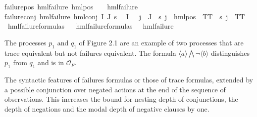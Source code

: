 \begin{isabellebody}
failure{\isacharunderscore}{\kern0pt}pos{\isacharcolon}{\kern0pt}\ {\isachardoublequoteopen}hml{\isacharunderscore}{\kern0pt}failure\ {\isacharparenleft}{\kern0pt}hml{\isacharunderscore}{\kern0pt}pos\ {\isasymalpha}\ {\isasymphi}{\isacharparenright}{\kern0pt}{\isachardoublequoteclose}\ \ {\isachardoublequoteopen}hml{\isacharunderscore}{\kern0pt}failure\ {\isasymphi}{\isachardoublequoteclose}\ {\isacharbar}{\kern0pt}\isanewline
failure{\isacharunderscore}{\kern0pt}conj{\isacharcolon}{\kern0pt}\ {\isachardoublequoteopen}hml{\isacharunderscore}{\kern0pt}failure\ {\isacharparenleft}{\kern0pt}hml{\isacharunderscore}{\kern0pt}conj\ I\ J\ {\isasympsi}s{\isacharparenright}{\kern0pt}{\isachardoublequoteclose}\ \isanewline
{}\ {\isachardoublequoteopen}I\ {\isacharequal}{\kern0pt}\ {\isacharbraceleft}{\kern0pt}{\isacharbraceright}{\kern0pt}{\isachardoublequoteclose}\ {\isachardoublequoteopen}{\isacharparenleft}{\kern0pt}{\isasymforall}j\ {\isasymin}\ J{\isachardot}{\kern0pt}\ {\isacharparenleft}{\kern0pt}{\isasymexists}{\isasymalpha}{\isachardot}{\kern0pt}\ {\isacharparenleft}{\kern0pt}{\isacharparenleft}{\kern0pt}{\isasympsi}s\ j{\isacharparenright}{\kern0pt}\ {\isacharequal}{\kern0pt}\ hml{\isacharunderscore}{\kern0pt}pos\ {\isasymalpha}\ TT{\isacharparenright}{\kern0pt}{\isacharparenright}{\kern0pt}\ {\isasymor}\ {\isasympsi}s\ j\ {\isacharequal}{\kern0pt}\ TT{\isacharparenright}{\kern0pt}{\isachardoublequoteclose}\ \isanewline
\isanewline
{}\isamarkupfalse%
\ hml{\isacharunderscore}{\kern0pt}failure{\isacharunderscore}{\kern0pt}formulas\isanewline
\ \ \isanewline
{\isachardoublequoteopen}hml{\isacharunderscore}{\kern0pt}failure{\isacharunderscore}{\kern0pt}formulas\ {\isasymequiv}\ {\isacharbraceleft}{\kern0pt}{\isasymphi}{\isachardot}{\kern0pt}\ hml{\isacharunderscore}{\kern0pt}failure\ {\isasymphi}{\isacharbraceright}{\kern0pt}{\isachardoublequoteclose}%
\begin{isamarkuptext}%
The processes $p_1$ and $q_1$ of Figure 2.1 are an example of two processes that are trace equivalent but not failures equivalent. The formula $\langle a \rangle\bigwedge{\lnot\langle b \rangle}$ distinguishes $p_1$ from $q_1$ and is in $\mathcal{O}_F$.%
\end{isamarkuptext}\isamarkuptrue%
%
\begin{isamarkuptext}%
The syntactic features of failures formulas or those of trace formulas, extended by a possible conjunction over negated actions at the end of the sequence of observations. 
This increases the bound for nesting depth of conjunctions, the depth of negations and the modal depth of negative clauses by one.

\end{isamarkuptext}
\end{isabellebody}

